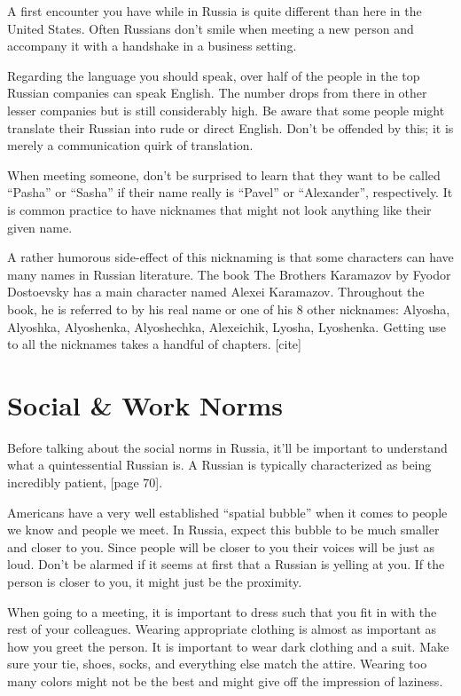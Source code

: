 \documentclass[11pt,a4paper,twoside]{report}
\begin{document}
A first encounter you have while in Russia is quite different than here in the
United States. Often Russians don’t smile when meeting a new person and
accompany it with a handshake in a business setting.

Regarding the language you should speak, over half of the people in the top
Russian companies can speak English. The number drops from there in other
lesser companies but is still considerably high. Be aware that some people
might translate their Russian into rude or direct English. Don’t be offended by
this; it is merely a communication quirk of translation.

When meeting someone, don’t be surprised to learn that they want to be called
“Pasha” or “Sasha” if their name really is “Pavel” or “Alexander”,
respectively. It is common practice to have nicknames that might not look
anything like their given name.

A rather humorous side-effect of this nicknaming is that some characters can
have many names in Russian literature. The book The Brothers Karamazov by
Fyodor Dostoevsky has a main character named Alexei Karamazov. Throughout the
book, he is referred to by his real name or one of his 8 other nicknames:
Alyosha, Alyoshka, Alyoshenka, Alyoshechka, Alexeichik, Lyosha, Lyoshenka.
Getting use to all the nicknames takes a handful of chapters. [cite]

\section{Social \& Work Norms}

Before talking about the social norms in Russia, it’ll be important to
understand what a quintessential Russian is. A Russian is typically
characterized as being incredibly patient, [page 70].

Americans have a very well established “spatial bubble” when it comes to people
we know and people we meet. In Russia, expect this bubble to be much smaller
and closer to you. Since people will be closer to you their voices will be just
as loud. Don’t be alarmed if it seems at first that a Russian is yelling at
you. If the person is closer to you, it might just be the proximity.

When going to a meeting,  it is important to dress such that you fit in with
the rest of your colleagues. Wearing appropriate clothing is almost as
important as how you greet the person. It is important to wear dark clothing
and a suit. Make sure your tie, shoes, socks, and everything else match the
attire. Wearing too many colors might not be the best and might give off the
impression of laziness.
\end{document}
